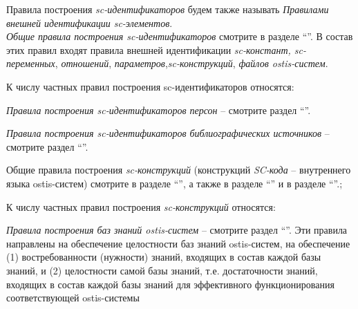 \begin{SCn}
{\begin{scnvector}
{\begin{scnitemize}
\begin{scnindent}
								\end{scnindent}
			            \end{scnitemize}}
			\item{Правила построения \textit{sc-идентификаторов} будем также
			            называть \textit{Правилами внешней идентификации sc-элементов}.\\
			            \textit{Общие правила построения sc-идентификаторов} смотрите в
			            разделе ``''. В состав этих правил входят правила внешней
			            идентификации \textit{sc-констант, sc-переменных}, \textit{отношений},
				            \textit{параметров},\textit{sc-конструкций}, \textit{файлов ostis-систем}.}
			\item{К числу частных правил построения sc-идентификаторов
			            относятся:
			            \begin{scnitemize}
				            \item\textit{Правила построения sc-идентификаторов
					            персон} -- смотрите раздел ``''.
				            \item\textit{Правила построения sc-идентификаторов
					            библиографических источников} -- смотрите раздел ``''.
			            \end{scnitemize}}
			\item{Общие правила построения \textit{sc-конструкций}
			            (конструкций \textit{SC-кода} -- внутреннего языка ostis-систем) смотрите в
			            разделе ``'', а также в разделе
			            ``'' и в разделе ``\nameref{sd_sc_code_semantic}''.};
			\item{К числу частных правил построения \textit{sc-конструкций}
			            относятся:
			            \begin{scnitemize}
				            \item \textit{Правила построения баз знаний
					            ostis-систем} -- смотрите раздел ``''. Эти правила направлены
				            на обеспечение целостности баз знаний ostis-систем, на обеспечение (1)
				            востребованности (нужности) знаний, входящих в состав каждой базы знаний, и (2)
				            целостности самой базы знаний, т.е. достаточности знаний, входящих в состав
				            каждой базы знаний для эффективного функционирования соответствующей
				            ostis-системы

\end{scnitemize}}
\end{scnvector}}
\end{SCn}

